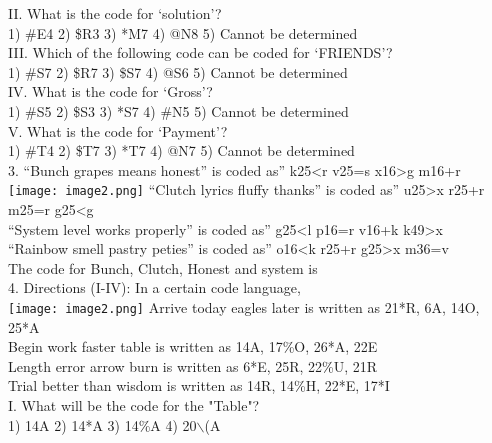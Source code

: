 \documentclass[
]{article}
\begin{document}
II. What is the code for ‘solution’?\\
1) \#E4  2) \$R3  3) *M7  4) @N8  5) Cannot be determined\\

III. Which of the following code can be coded for ‘FRIENDS’?\\
1) \#S7 2) \$R7 3) \$S7 \hspace{1.5mm}4) @S6 \hspace{1.5mm}5) Cannot be determined\\

IV. What is the code for ‘Gross’?\\
1) \#S5 2) \$S3 3) *S7 \hspace{1.5mm}4) \#N5 \hspace{1.5mm} 5) Cannot be determined\\

V. What is the code for ‘Payment’?\\
1) \#T4 \hspace{1.5mm}2) \$T7 \hspace{1.5mm}3) *T7 \hspace{1.5mm}4) @N7 \hspace{1.5mm}5) Cannot be determined\\
	
3. “Bunch grapes means honest” is coded as” k25<r v25=s x16>g m16+r\\
\texttt{[image: image2.png]}
“Clutch lyrics fluffy thanks” is coded as” u25>x r25+r m25=r g25<g\\
“System level works properly” is coded as” g25<l p16=r v16+k k49>x\\
“Rainbow smell pastry peties” is coded as” o16<k r25+r g25>x m36=v\\
The code for Bunch, Clutch, Honest and system is\\

4. Directions (I-IV): In a certain code language,\\
\texttt{[image: image2.png]}
Arrive today eagles later is written as 21*R, 6A, 14O, 25*A\\
Begin work faster table is written as 14A, 17\%O, 26*A, 22E\\
Length error arrow burn is written as 6*E, 25R, 22\%U, 21R\\
Trial better than wisdom is written as 14R, 14\%H, 22*E, 17*I \\
I. What will be the code for the "Table"?\\
1) 14A 2) 14*A 3) 14\%A 4) 20$\backslash$(A
\end{document}
